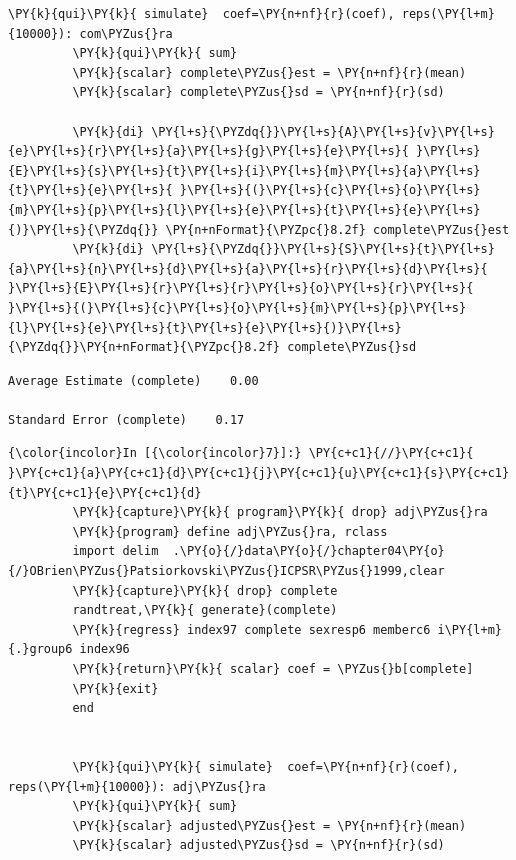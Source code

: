 \documentclass[11pt,notitlepage]{article}\usepackage[]{graphicx}\usepackage[]{color}
\makeatletter
\newenvironment{kframe}{%
 \def\at@end@of@kframe{}%
 \ifinner\ifhmode%
  \def\at@end@of@kframe{\end{minipage}}%
  \begin{minipage}{\columnwidth}%
 \fi\fi%
 \def\FrameCommand##1{\hskip\@totalleftmargin \hskip-\fboxsep
 \colorbox{shadecolor}{##1}\hskip-\fboxsep
     \hskip-\linewidth \hskip-\@totalleftmargin \hskip\columnwidth}%
 \MakeFramed {\advance\hsize-\width
   \@totalleftmargin\z@ \linewidth\hsize
   \@setminipage}}%
 {\par\unskip\endMakeFramed%
 \at@end@of@kframe}
\newenvironment{knitrout}{}{} %
\makeatother
\begin{document}
\begin{enumerate}[a)]
\begin{knitrout}
\begin{kframe}
\begin{Verbatim}[commandchars=\\\{\}]
         \PY{k}{qui}\PY{k}{ simulate}  coef=\PY{n+nf}{r}(coef), reps(\PY{l+m}{10000}): com\PYZus{}ra
         \PY{k}{qui}\PY{k}{ sum}
         \PY{k}{scalar} complete\PYZus{}est = \PY{n+nf}{r}(mean)
         \PY{k}{scalar} complete\PYZus{}sd = \PY{n+nf}{r}(sd)
         
         \PY{k}{di} \PY{l+s}{\PYZdq{}}\PY{l+s}{A}\PY{l+s}{v}\PY{l+s}{e}\PY{l+s}{r}\PY{l+s}{a}\PY{l+s}{g}\PY{l+s}{e}\PY{l+s}{ }\PY{l+s}{E}\PY{l+s}{s}\PY{l+s}{t}\PY{l+s}{i}\PY{l+s}{m}\PY{l+s}{a}\PY{l+s}{t}\PY{l+s}{e}\PY{l+s}{ }\PY{l+s}{(}\PY{l+s}{c}\PY{l+s}{o}\PY{l+s}{m}\PY{l+s}{p}\PY{l+s}{l}\PY{l+s}{e}\PY{l+s}{t}\PY{l+s}{e}\PY{l+s}{)}\PY{l+s}{\PYZdq{}} \PY{n+nFormat}{\PYZpc{}8.2f} complete\PYZus{}est
         \PY{k}{di} \PY{l+s}{\PYZdq{}}\PY{l+s}{S}\PY{l+s}{t}\PY{l+s}{a}\PY{l+s}{n}\PY{l+s}{d}\PY{l+s}{a}\PY{l+s}{r}\PY{l+s}{d}\PY{l+s}{ }\PY{l+s}{E}\PY{l+s}{r}\PY{l+s}{r}\PY{l+s}{o}\PY{l+s}{r}\PY{l+s}{ }\PY{l+s}{(}\PY{l+s}{c}\PY{l+s}{o}\PY{l+s}{m}\PY{l+s}{p}\PY{l+s}{l}\PY{l+s}{e}\PY{l+s}{t}\PY{l+s}{e}\PY{l+s}{)}\PY{l+s}{\PYZdq{}}\PY{n+nFormat}{\PYZpc{}8.2f} complete\PYZus{}sd
\end{Verbatim}

    \begin{Verbatim}[commandchars=\\\{\}]
Average Estimate (complete)    0.00

Standard Error (complete)    0.17

    \end{Verbatim}

    \begin{Verbatim}[commandchars=\\\{\}]
{\color{incolor}In [{\color{incolor}7}]:} \PY{c+c1}{//}\PY{c+c1}{ }\PY{c+c1}{a}\PY{c+c1}{d}\PY{c+c1}{j}\PY{c+c1}{u}\PY{c+c1}{s}\PY{c+c1}{t}\PY{c+c1}{e}\PY{c+c1}{d}
         \PY{k}{capture}\PY{k}{ program}\PY{k}{ drop} adj\PYZus{}ra
         \PY{k}{program} define adj\PYZus{}ra, rclass
         import delim  .\PY{o}{/}data\PY{o}{/}chapter04\PY{o}{/}OBrien\PYZus{}Patsiorkovski\PYZus{}ICPSR\PYZus{}1999,clear
         \PY{k}{capture}\PY{k}{ drop} complete
         randtreat,\PY{k}{ generate}(complete)
         \PY{k}{regress} index97 complete sexresp6 memberc6 i\PY{l+m}{.}group6 index96
         \PY{k}{return}\PY{k}{ scalar} coef = \PYZus{}b[complete]
         \PY{k}{exit}
         end
         
         
         \PY{k}{qui}\PY{k}{ simulate}  coef=\PY{n+nf}{r}(coef), reps(\PY{l+m}{10000}): adj\PYZus{}ra
         \PY{k}{qui}\PY{k}{ sum}
         \PY{k}{scalar} adjusted\PYZus{}est = \PY{n+nf}{r}(mean)
         \PY{k}{scalar} adjusted\PYZus{}sd = \PY{n+nf}{r}(sd)
         

\end{Verbatim}
\end{kframe}
\end{knitrout}
\end{enumerate}
\end{document}
